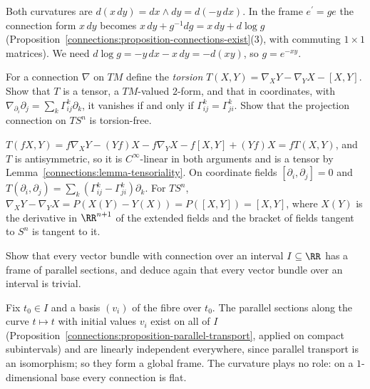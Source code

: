 \begin{solution}
Both curvatures are $d(x\,dy) = dx \wedge dy = d(-y\,dx)$. In the frame $e^{\prime} = ge$ the connection form $x\,dy$ becomes $x\,dy + g^{-1}dg = x\,dy + d\log g$
(Proposition~\ref{connections:proposition-connections-exist}(3), with commuting $1 \times 1$ matrices). We need $d\log g = -y\,dx - x\,dy = -d(xy)$, so $g = e^{-xy}$.
\end{solution}

\begin{exercise}\label{connections:exercise-torsion}
For a connection $\nabla$ on $TM$ define the \emph{torsion} $T(X, Y) = \nabla_XY - \nabla_YX - [X, Y]$. Show that $T$ is a tensor, a $TM$-valued $2$-form, and that in coordinates,
with $\nabla_{\partial_i}\partial_j = \sum_k\Gamma^k_{ij}\partial_k$, it vanishes if and only if $\Gamma^k_{ij} = \Gamma^k_{ji}$. Show that the projection connection on $TS^n$ is
torsion-free.
\end{exercise}

\begin{solution}
$T(fX, Y) = f\nabla_XY - (Yf)X - f\nabla_YX - f[X, Y] + (Yf)X = fT(X, Y)$, and $T$ is antisymmetric, so it is $C^\infty$-linear in both arguments and is a tensor by
Lemma~\ref{connections:lemma-tensoriality}. On coordinate fields $[\partial_i, \partial_j] = 0$ and $T(\partial_i, \partial_j) = \sum_k(\Gamma^k_{ij} - \Gamma^k_{ji})\partial_k$. For $TS^n$,
$\nabla_XY - \nabla_YX = P(X(Y) - Y(X)) = P([X, Y]) = [X, Y]$, where $X(Y)$ is the derivative in $\RR^{n+1}$ of the extended fields and the bracket of fields tangent to $S^n$ is
tangent to it.
\end{solution}

\begin{exercise}\label{connections:exercise-connections-on-intervals}
Show that every vector bundle with connection over an interval $I \subseteq \RR$ has a frame of parallel sections, and deduce again that every vector bundle over an interval
is trivial.
\end{exercise}

\begin{solution}
Fix $t_0 \in I$ and a basis $(v_i)$ of the fibre over $t_0$. The parallel sections along the curve $t \mapsto t$ with initial values $v_i$ exist on all of $I$
(Proposition~\ref{connections:proposition-parallel-transport}, applied on compact subintervals) and are linearly independent everywhere, since parallel transport is an isomorphism;
so they form a global frame. The curvature plays no role: on a $1$-dimensional base every connection is flat.
\end{solution}


